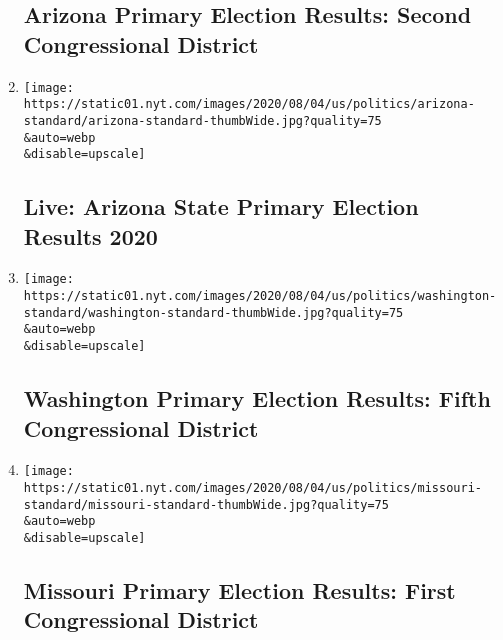 \begin{enumerate}
{  \subsection{Arizona Primary Election Results: Second Congressional
  District}\label{arizona-primary-election-results-second-congressional-district}}
\item
  \href{/interactive/2020/08/04/us/elections/results-arizona-primary-elections.html}{}

  \texttt{[image: https://static01.nyt.com/images/2020/08/04/us/politics/arizona-standard/arizona-standard-thumbWide.jpg?quality=75\\\&auto=webp\\\&disable=upscale]}

  \hypertarget{live-arizona-state-primary-election-results-2020}{%
  \subsection{Live: Arizona State Primary Election Results
  2020}\label{live-arizona-state-primary-election-results-2020}}
\item
  \href{/interactive/2020/08/04/us/elections/results-washington-house-district-5-primary-election.html}{}

  \texttt{[image: https://static01.nyt.com/images/2020/08/04/us/politics/washington-standard/washington-standard-thumbWide.jpg?quality=75\\\&auto=webp\\\&disable=upscale]}

  \hypertarget{washington-primary-election-results-fifth-congressional-district}{%
  \subsection{Washington Primary Election Results: Fifth Congressional
  District}\label{washington-primary-election-results-fifth-congressional-district}}
\item
  \href{/interactive/2020/08/04/us/elections/results-missouri-house-district-1-primary-election.html}{}

  \texttt{[image: https://static01.nyt.com/images/2020/08/04/us/politics/missouri-standard/missouri-standard-thumbWide.jpg?quality=75\\\&auto=webp\\\&disable=upscale]}

  \hypertarget{missouri-primary-election-results-first-congressional-district}{%
  \subsection{Missouri Primary Election Results: First Congressional
  District}\label{missouri-primary-election-results-first-congressional-district}}
\end{enumerate}

